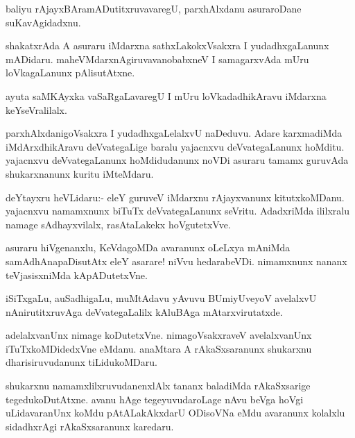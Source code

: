 \documentclass{article}
\begin{document}
\begin{mn}
baliyu rAjayxBAramADutitxruvavaregU, parxhAlxdanu asuraroDane suKavAgidadxnu.
\end{mn}

\begin{mn}%
shakatxrAda A asuraru iMdarxna sathxLakokxVsakxra I yudadhxgaLanunx
mADidaru. maheVMdarxnAgiruvavanobabxneV I samagarxvAda mUru
loVkagaLanunx pAlisutAtxne.
\end{mn}

\begin{mn}
ayuta saMKAyxka vaSaRgaLavaregU I mUru loVkadadhikAravu iMdarxna keYseVralilalx.
\end{mn}

\begin{mn}
parxhAlxdanigoVsakxra I yudadhxgaLelalxvU naDeduvu. Adare karxmadiMda
iMdArxdhikAravu deVvategaLige baralu yajacnxvu deVvategaLanunx
hoMditu. yajacnxvu deVvategaLanunx hoMdidudanunx noVDi asuraru tamamx
guruvAda shukarxnanunx kuritu iMteMdaru.
\end{mn}

\begin{mn}
deYtayxru heVLidaru:- eleY guruveV iMdarxnu rAjayxvanunx
kitutxkoMDanu. yajacnxvu namamxnunx biTuTx deVvategaLanunx
seVritu. AdadxriMda ililxralu namage sAdhayxvilalx, rasAtaLakekx hoVgutetxVve.
\end{mn}

\begin{mn}%
asuraru hiVgenanxlu, KeVdagoMDa avaranunx oLeLxya mAniMda
samAdhAnapaDisutAtx eleY asarare! niVvu hedarabeVDi. nimamxnunx nananx
teVjasisxniMda kApADutetxVne.
\end{mn}

\begin{mn}
iSiTxgaLu, auSadhigaLu, muMtAdavu yAvuvu BUmiyUveyoV avelalxvU
nAnirutitxruvAga deVvategaLalilx kAluBAga mAtarxvirutatxde.
\end{mn}

\begin{mn}
adelalxvanUnx nimage koDutetxVne. nimagoVsakxraveV avelalxvanUnx
iTuTxkoMDidedxVne eMdanu. anaMtara A rAkaSxsaranunx shukarxnu
dharisiruvudanunx tiLidukoMDaru.
\end{mn}

\begin{mn}%
shukarxnu namamxlilxruvudanenxlAlx tananx baladiMda rAkaSxsarige
tegedukoDutAtxne. avanu hAge tegeyuvudaroLage nAvu beVga hoVgi
uLidavaranUnx koMdu pAtALakAkxdarU ODisoVNa eMdu avaranunx kolalxlu
sidadhxrAgi rAkaSxsaranunx karedaru.
\end{mn}
\end{document}
